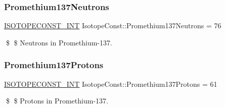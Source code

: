\subsubsection{\texorpdfstring{Promethium137\+Neutrons}{Promethium137Neutrons}}
{\footnotesize\ttfamily \mbox{\hyperlink{group___isotope_const-_macros_ga5f18360b3e99483a35c32d789e62621c}{I\+S\+O\+T\+O\+P\+E\+C\+O\+N\+S\+T\+\_\+\+I\+NT}} Isotope\+Const\+::\+Promethium137\+Neutrons = 76}

\$ \$ Neutrons in Promethium-\/137. \mbox{\label{group___isotope_const-_promethium-_pm137_ga1f09423a0a9f807e825cf4daca98e8cd}} 
\subsubsection{\texorpdfstring{Promethium137\+Protons}{Promethium137Protons}}
{\footnotesize\ttfamily \mbox{\hyperlink{group___isotope_const-_macros_ga5f18360b3e99483a35c32d789e62621c}{I\+S\+O\+T\+O\+P\+E\+C\+O\+N\+S\+T\+\_\+\+I\+NT}} Isotope\+Const\+::\+Promethium137\+Protons = 61}

\$ \$ Protons in Promethium-\/137. 